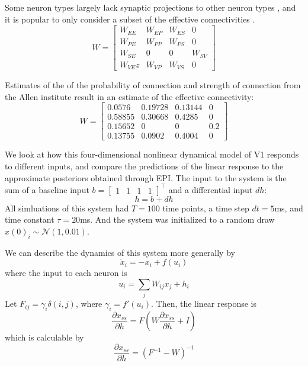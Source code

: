 \documentclass[11pt]{article}
\begin{document}
Some neuron types largely lack synaptic projections to other neuron types \cite{pfeffer2013inhibition}, and it is popular to only consider a subset of the effective connectivities \cite{litwin2016inhibitory}.
\begin{equation}
W = \begin{bmatrix} W_{EE} & W_{EP} & W_{ES} & 0 \\
                                W_{PE} & W_{PP} & W_{PS} & 0 \\
                                W_{SE} & 0 & 0 & W_{SV} \\
                                W_{VE}z & W_{VP} &  W_{VS} &  0 \end{bmatrix}
\end{equation}

Estimates of the of the probability of connection and strength of connection from the Allen institute result in an estimate of the effective connectivity:
\begin{equation}
W = \begin{bmatrix} 0.0576 &  0.19728 & 0.13144 & 0 \\
                                0.58855 & 0.30668 & 0.4285 & 0 \\
                                0.15652 & 0 & 0 & 0.2 \\
                                0.13755 & 0.0902 &  0.4004 &  0 \end{bmatrix}
\end{equation}

We look at how this four-dimensional nonlinear dynamical model of V1 responds to different inputs, and compare the predictions of the linear response to the approximate posteriors obtained through EPI.  The input to the system is the sum of a baseline input $b = \begin{bmatrix} 1 & 1 & 1 & 1 \end{bmatrix}^\top$ and a differential input $dh$:
\begin{equation}
h = b + dh
\end{equation}
All simluations of this system had $T=100$ time points, a time step $dt = 5$ms, and time constant $\tau = 20$ms.  And the system was initialized to a random draw $x(0)_i \sim \mathcal{N}(1, 0.01)$.

We can describe the dynamics of this system more generally by
\begin{equation}
\dot{x}_i = -x_i + f(u_i)
\end{equation}
where the input to each neuron is
\begin{equation}
u_i = \sum_j W_{ij} x_j + h_i
\end{equation}
Let $F_{ij} = \gamma_i \delta(i,j)$, where $\gamma_i = f'(u_i)$.  Then, the linear response is
\begin{equation}
\frac{\partial x_{ss}}{\partial h} = F(W\frac{\partial x_{ss}}{\partial h} + I)
\end{equation}
which is calculable by
\begin{equation}
\frac{\partial x_{ss}}{\partial h} = (F^{-1} - W)^{-1}
\end{equation}
\end{document}
